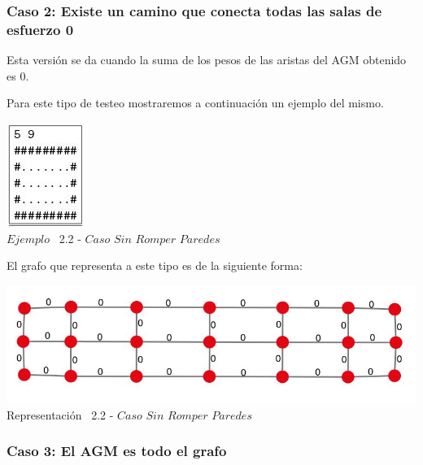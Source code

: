  \begin{center}
 \subsubsection*{Caso 2: Existe un camino que conecta todas las salas de esfuerzo 0}
\end{center}

Esta versi\'on se da cuando la suma de los pesos de las aristas del AGM obtenido es 0. 

Para este tipo de testeo mostraremos a continuaci\'on un ejemplo del mismo.\\

\vspace*{0.3cm} \vspace*{0.3cm}
  \begin{center}
 \includegraphics[scale=1.6]{./EJ2/ej2sinpared.jpeg}
 \\{$Ejemplo$ \ 2.2 - $Caso$ $Sin$ $Romper$ $Paredes$}
  \end{center}
  \vspace*{0.3cm}

El grafo que representa a este tipo es de la siguiente forma:\\

\vspace*{0.3cm} \vspace*{0.3cm}
  \begin{center}
 \includegraphics[scale=0.5]{./EJ2/ej2grafosinpared.jpeg}
 \\{Representación \ 2.2 - $Caso$ $Sin$ $Romper$ $Paredes$}
  \end{center}
  \vspace*{0.3cm}
  
\begin{center}
\subsubsection*{Caso 3: El AGM es todo el grafo}
\end{center}

